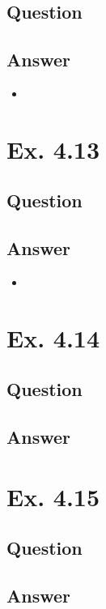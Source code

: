 \documentclass[12pt]{article}
\begin{document}
\subsection*{Question}

\subsection*{Answer}
\begin{itemize}
	\item 
\end{itemize}

\newpage
\section*{Ex. 4.13}
\subsection*{Question}

\subsection*{Answer}
\begin{itemize}
	\item 
\end{itemize}

\newpage
\section*{Ex. 4.14}
\subsection*{Question}

\subsection*{Answer}

\section*{Ex. 4.15}
\subsection*{Question}

\subsection*{Answer}
\end{document}

